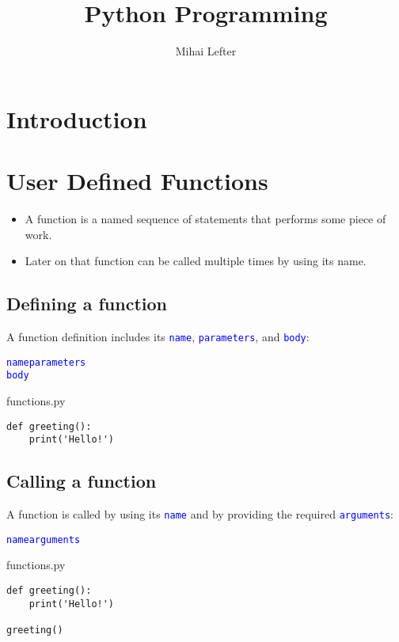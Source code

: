 \documentclass[aspectratio=1610,slidestop]{beamer}
\author{Mihai Lefter}
\title{Python Programming}
\newcommand{\decl}[1]{\textcolor{blue}{\lstinline{#1}}}
\begin{document}

\makeTitleSlide{}


\section{Introduction}
\makeTableOfContents


\section{User Defined Functions}

\begin{pframe}
 \begin{itemize}
  \item A function is a named sequence of statements that performs some piece
        of work.
  \item Later on that function can be called multiple times by using its name.
 \end{itemize}
\end{pframe}


\subsection{Defining a function}
\begin{pframe}
 A function definition includes its \decl{name}, \decl{parameters}, and \decl{body}:
 \begin{pythondeclaration}
  \textvisiblespace\decl{name}\emp{(}\decl{parameters}\emp{):}\\
  \textvisiblespace\textvisiblespace\textvisiblespace\textvisiblespace\decl{body}
 \end{pythondeclaration}
 \pause
 \begin{pythonfile}{functions.py}
  \begin{verbatim}
def greeting():
    print('Hello!')
  \end{verbatim}
 \end{pythonfile}
\end{pframe}


\subsection{Calling a function}
\begin{pframe}
 A function is called by using its \decl{name} and by providing the required
 \decl{arguments}:
 \begin{pythondeclaration}
  \decl{name}\emp{(}\decl{arguments}\emp{)}
 \end{pythondeclaration}
 \pause
 \begin{pythonfile}{functions.py}
  \begin{verbatim}
def greeting():
    print('Hello!')

greeting()
  \end{verbatim}
 \end{pythonfile}
\end{pframe}
\end{document}
